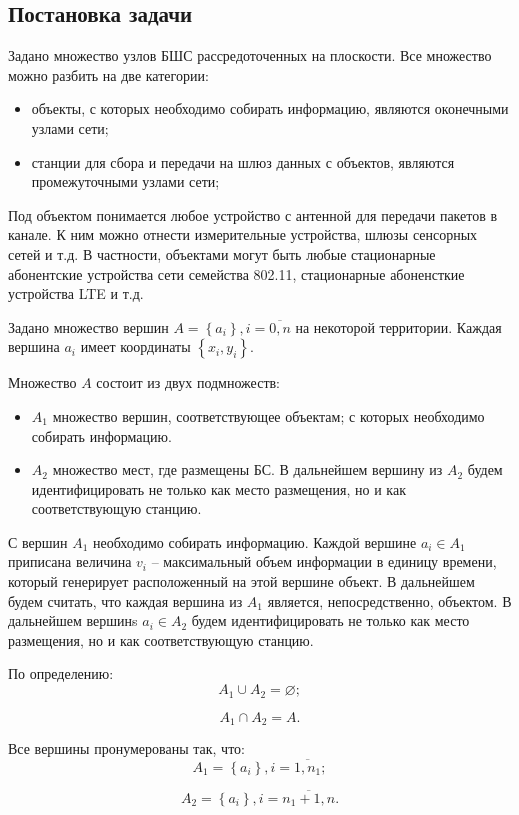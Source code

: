 \subsection{Постановка задачи}

Задано множество узлов БШС рассредоточенных на плоскости. Все множество можно разбить на две категории:
\begin{itemize}
    \item объекты, с которых необходимо собирать информацию, являются оконечными узлами сети;
    \item станции для сбора и передачи на шлюз данных с объектов, являются промежуточными узлами сети; 
\end{itemize}
Под объектом понимается любое устройство с антенной для передачи пакетов в канале. К ним можно отнести измерительные устройства, шлюзы сенсорных сетей и т.д. В частности, объектами могут быть любые стационарные абонентские устройства сети семейства 802.11, стационарные абоненсткие устройства LTE и т.д.

Задано множество вершин $A= \left\{ a_i \right\}, i=\overline{0,n}$ на некоторой территории. Каждая вершина $a_i$ имеет координаты $\left\{ x_i, y_i \right\}$.

Множество $A$ состоит из двух подмножеств:
\begin{itemize}
    \item $A_1$ множество вершин, соответствующее объектам; с которых необходимо собирать информацию. 
    \item $A_2$ множество мест, где размещены БС. В дальнейшем вершину из $A_2$ будем идентифицировать  не только как место размещения, но и как соответствующую станцию.
\end{itemize}
С вершин $A_1$ необходимо собирать информацию. Каждой вершине $a_i \in A_1$ приписана величина $v_i$ -- максимальный объем информации в единицу времени, который генерирует расположенный на этой вершине объект.  В дальнейшем будем считать, что каждая вершина из $A_1$ является, непосредственно, объектом. В дальнейшем вершинs  $a_i \in A_2$ будем идентифицировать не только как место размещения, но и как соответствующую станцию.

По определению:
$$
A_1 \cup A_2 = \varnothing;
$$

$$
A_1 \cap A_2 = A.
$$

Все вершины пронумерованы так, что:
$$
A_1 = \left\{a_i \right\}, i= \overline{1,n_1};
$$

$$
A_2 = \left\{ a_i  \right\}, i= \overline{n_1+1,n}.
$$


